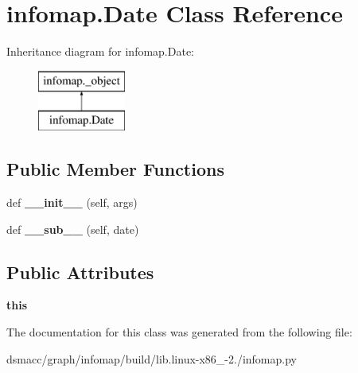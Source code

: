 \hypertarget{classinfomap_1_1Date}{}\section{infomap.\+Date Class Reference}
\label{classinfomap_1_1Date}
Inheritance diagram for infomap.\+Date\+:\begin{figure}[H]
\begin{center}
\leavevmode
\includegraphics[height=2.000000cm]{classinfomap_1_1Date}
\end{center}
\end{figure}
\subsection*{Public Member Functions}
\begin{DoxyCompactItemize}
\item 
\mbox{\label{classinfomap_1_1Date_a15ba2a1c1b2df09131222149f0dd041b}} 
def {\bfseries \+\_\+\+\_\+init\+\_\+\+\_\+} (self, args)
\item 
\mbox{\label{classinfomap_1_1Date_ad66542662b927f726f6f3af01c96c124}} 
def {\bfseries \+\_\+\+\_\+sub\+\_\+\+\_\+} (self, date)
\end{DoxyCompactItemize}
\subsection*{Public Attributes}
\begin{DoxyCompactItemize}
\item 
\mbox{\label{classinfomap_1_1Date_a4fb036806ed28e8d278f7d83a8672b14}} 
{\bfseries this}
\end{DoxyCompactItemize}


The documentation for this class was generated from the following file\+:\begin{DoxyCompactItemize}
\item 
dsmacc/graph/infomap/build/lib.\+linux-\/x86\+\_-\/2./infomap.\+py\end{DoxyCompactItemize}

